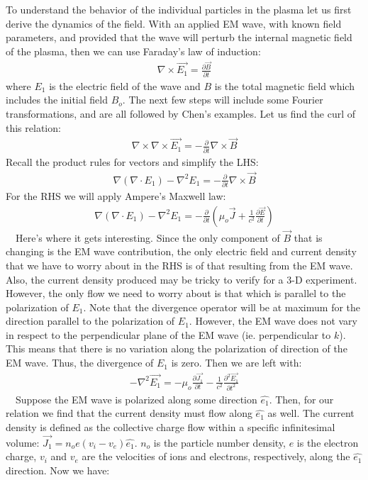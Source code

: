 \documentclass[11pt]{article}
\theoremstyle{quest}
\newcommand{\Prdf}[2]{\frac{\partial #1}{\partial #2}}
\newcommand{\ScPrdf}[2]{\frac{\partial^2 #1}{\partial #2^2}}
\begin{document}
To understand the behavior of the individual particles in the plasma let us first derive the dynamics of the field. With an applied EM wave, with known field parameters, and provided that the wave will perturb the internal magnetic field of the plasma, then we can use Faraday's law of induction:\\
\begin{align*}
	\nabla \times\vec{E_1} = \Prdf{\vec{B}}{t}
\end{align*}
where $E_1$ is the electric field of the wave and $B$ is the total magnetic field which includes the initial field $B_o$. The next few steps will include some Fourier transformations, and are all followed by Chen's examples. Let us find the curl of this relation:
\begin{align}
	\nabla \times \nabla \times \vec{E_1} = - \Prdf{}{t} \nabla \times \vec{B}
\end{align}
Recall the product rules for vectors and simplify the LHS:
\begin{align*}
	\nabla \left(\nabla \cdot E_1 \right) - \nabla^2 E_1 = -  \Prdf{}{t} \nabla \times \vec{B}
\end{align*}
For the RHS we will apply Ampere's Maxwell law:
\begin{align*}
	\nabla \left(\nabla \cdot E_1 \right) - \nabla^2 E_1 = -  \Prdf{}{t} \left(\mu_o \vec{J} + \frac{1}{c^2}\Prdf{\vec{E}}{t} \right)
\end{align*}
~~Here's where it gets interesting. Since the only component of $\vec{B}$ that is changing is the EM wave contribution, the only electric field and current density that we have to worry about in the RHS is of that resulting from the EM wave. Also, the current density produced may be tricky to verify for a 3-D experiment. However, the only flow we need to worry about is that which is parallel to the polarization of $E_1$. Note that the divergence operator will be at maximum for the direction parallel to the polarization of $E_1$. However, the EM wave does not vary in respect to the perpendicular plane of the EM wave (ie. perpendicular to $k$). This means that there is no variation along the polarization of direction of the EM wave. Thus, the divergence of $E_1$ is zero. Then we are left with:
\begin{align*}
	-\nabla^2 \vec{E_1} = -\mu_o \Prdf{\vec{J_1}}{t} -\frac{1}{c^2}\ScPrdf{\vec{E_1}}{t}
\end{align*}
~~Suppose the EM wave is polarized along some direction $\hat{e_1}$. Then, for our relation we find that the current density must flow along $\hat{e_1}$ as well. The current density is defined as the collective charge flow within a specific infinitesimal volume: $\vec{J_1} = n_o e \left(v_i - v_e \right) \hat{e_1}$. $n_o$ is the particle number density, $e$ is the electron charge, $v_i$ and $v_e$ are the velocities of ions and electrons, respectively, along the $\hat{e_1}$ direction. Now we have:
\end{document}
